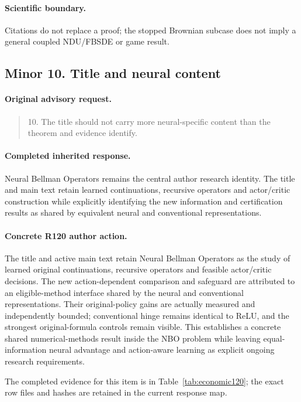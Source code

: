 \paragraph{Scientific boundary.}
Citations do not replace a proof; the stopped Brownian subcase does not imply a general coupled NDU/FBSDE or game result.

\subsection{Minor 10. Title and neural content}
\label{response120:minor-10}
\paragraph{Original advisory request.}
\begin{quote}
10. The title should not carry more neural-specific content than the theorem and evidence identify.
\end{quote}
\paragraph{Completed inherited response.}
Neural Bellman Operators remains the central author research identity. The title and main text retain learned continuations, recursive operators and actor/critic construction while explicitly identifying the new information and certification results as shared by equivalent neural and conventional representations.
\paragraph{Concrete R120 author action.}
The title and active main text retain Neural Bellman Operators as the study of learned original continuations, recursive operators and feasible actor/critic decisions. The new action-dependent comparison and safeguard are attributed to an eligible-method interface shared by the neural and conventional representations. Their original-policy gains are actually measured and independently bounded; conventional hinge remains identical to ReLU, and the strongest original-formula controls remain visible. This establishes a concrete shared numerical-methods result inside the NBO problem while leaving equal-information neural advantage and action-aware learning as explicit ongoing research requirements.

The completed evidence for this item is in Table~\ref{tab:economic120}; the exact row files and hashes are retained in the current response map.
